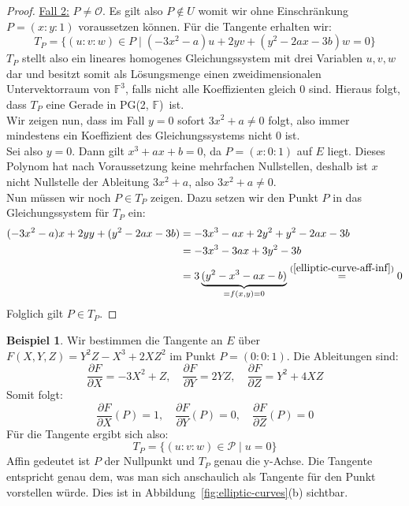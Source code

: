 \documentclass[hidelinks]{article}
\theoremstyle{plain}
\theoremstyle{definition}
\newtheorem{bsp}[thm]{Beispiel}
\theoremstyle{rem}
\newcommand{\pgtwo}{PG(2, $\mathbb{F}$)\ }
\newcommand{\patinf}{\mathcal{O}}
\begin{document}
\begin{sloppypar}
\begin{proof}
    \underline{Fall 2:} $P\ne\patinf$. Es gilt also $P\notin U$ womit wir ohne Einschränkung $P=(x:y:1)$ voraussetzen können. Für die Tangente erhalten wir:
    \begin{equation*}
        T_{P}=\{(u:v:w)\in P\mid (-3x^2-a)u+2yv+(y^2-2ax-3b)w=0\}
    \end{equation*}
    $T_P$ stellt also ein lineares homogenes Gleichungssystem mit drei Variablen $u,v,w$ dar und besitzt somit als Lösungsmenge einen zweidimensionalen Untervektorraum von $\mathbb{F}^3$, falls nicht alle Koeffizienten gleich 0 sind. Hieraus folgt, dass $T_P$ eine Gerade in \pgtwo ist.\\
    Wir zeigen nun, dass im Fall $y=0$ sofort $3x^2+a\ne0$ folgt, also immer mindestens ein Koeffizient des Gleichungssystems nicht 0 ist.\\
    Sei also $y=0$. Dann gilt $x^3+ax+b=0$, da $P=(x:0:1)$ auf $E$ liegt. Dieses Polynom hat nach Voraussetzung keine mehrfachen Nullstellen, deshalb ist $x$ nicht Nullstelle der Ableitung $3x^2+a$, also $3x^2+a\ne0$.\\
    Nun müssen wir noch $P\in T_P$ zeigen. Dazu setzen wir den Punkt $P$ in das Gleichungssystem für $T_P$ ein:
    \begin{align*}
        (-3x^2-a)x+2yy+(y^2-2ax-3b)&=-3x^3-ax+2y^2+y^2-2ax-3b\\
	&=-3x^3-3ax+3y^2-3b\\
        &=3\underbrace{(y^2-x^3-ax-b)}_{=f(x,y)=0}\stackrel{(\ref{elliptic-curve-aff-inf})}{=}0
    \end{align*}
    Folglich gilt $P\in T_P$.
\end{proof}
\begin{bsp}
    Wir bestimmen die Tangente an $E$ über $F(X,Y,Z)=Y^2Z-X^3+2XZ^2$ im Punkt \mbox{$P=(0:0:1)$}. Die Ableitungen sind:
    \begin{equation*}
        \frac{\partial F}{\partial X}=-3X^2+Z,\quad \frac{\partial F}{\partial Y}=2YZ,\quad \frac{\partial F}{\partial Z}=Y^2+4XZ
    \end{equation*}
    Somit folgt:
    \begin{equation*}
        \frac{\partial F}{\partial X}(P)=1,\quad \frac{\partial F}{\partial Y}(P)=0,\quad \frac{\partial F}{\partial Z}(P)=0
    \end{equation*}
    Für die Tangente ergibt sich also:
    \begin{equation*}
        T_P=\{(u:v:w)\in \mathcal{P}\mid u=0\}
    \end{equation*}
    Affin gedeutet ist $P$ der Nullpunkt und $T_P$ genau die y-Achse. Die Tangente entspricht genau dem, was man sich anschaulich als Tangente für den Punkt vorstellen würde. Dies ist in Abbildung~\ref{fig:elliptic-curves}(b) sichtbar.

\end{bsp}
\end{sloppypar}
\end{document}

